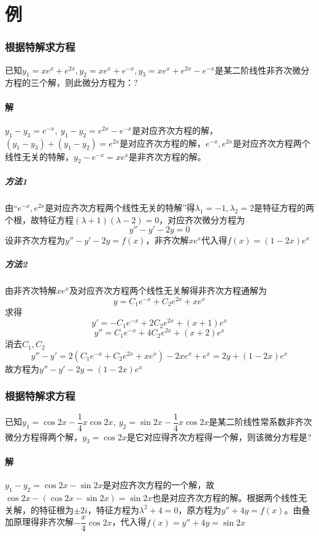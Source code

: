 \section{例}

\subsubsection{根据特解求方程}
已知\(y_1 = xe^x + e^{2x}, y_2 = xe^x + e^{-x}, y_3 = xe^x + e^{2x} - e^{-x}\)是某二阶线性非齐次微分方程的三个解，则此微分方程为：?
\paragraph{解}
\(y_1 - y_3 = e^{-x},\ y_1 - y_2 = e^{2x} - e^{-x}\)是对应齐次方程的解，\((y_1 - y_3) + (y_1 - y_2) = e^{2x}\)是对应齐次方程的解，\(e^{-x}, e^{2x}\)是对应齐次方程两个线性无关的特解，\(y_2 - e^{-x} = xe^x\)是非齐次方程的解。

\subparagraph{方法1}
由“\(e^{-x}, e^{2x}\)是对应齐次方程两个线性无关的特解”得\(\lambda_1 = -1, \lambda_2 = 2\)是特征方程的两个根，故特征方程\((\lambda + 1)(\lambda - 2) = 0\)，对应齐次微分方程为\[y'' - y' - 2y = 0\]
设非齐次方程为\(y'' - y' - 2y = f(x)\)，非齐次解\(xe^x\)代入得\(f(x) = (1 - 2x)e^x\)

\subparagraph{方法2}
由非齐次特解\(xe^x\)及对应齐次方程两个线性无关解得非齐次方程通解为\[y = C_1e^{-x} + C_2e^{2x} + xe^x\]
求得\[y' = -C_1e^{-x} + 2C_2e^{2x} + (x + 1)e^x\]
\[y'' = C_1e^{-x} + 4C_2e^{2x} + (x + 2)e^x\]
消去\(C_1, C_2\)\[y'' - y' = 2(C_1e^{-x} + C_2e^{2x} + xe^x) - 2xe^x + e^x = 2y + (1 - 2x)e^x\]
故方程为\(y'' - y' - 2y = (1 - 2x)e^x\)


\subsubsection{根据特解求方程}
已知\(y_1 = \cos2x - \dfrac{1}{4}x\cos2x,\ y_2 = \sin2x - \dfrac{1}{4}x\cos2x\)是某二阶线性常系数非齐次微分方程得两个解，\(y_3 = \cos2x\)是它对应得齐次方程得一个解，则该微分方程是?

\paragraph{解}
\(y_1 - y_2 = \cos2x - \sin2x\)是对应齐次方程的一个解，故\(\cos2x - (\cos2x - \sin2x) = \sin2x\)也是对应齐次方程的解。根据两个线性无关解，的特征根为\(\pm2i\)，特征方程为\(\lambda^2 + 4 = 0\)，原方程为\(y'' + 4y = f(x)\)。由叠加原理得非齐次解\(-\dfrac{x}{4}\cos2x\)，代入得\(f(x) = y'' + 4y = \sin2x\)


